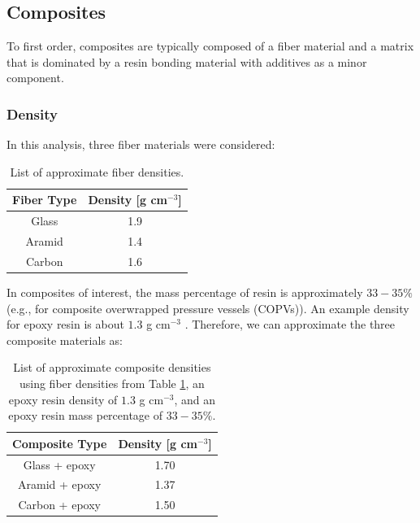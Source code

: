 \documentclass{hitec}
\begin{document}
\subsection{Composites}\label{ssec:composites}

To first order, composites are typically composed of a fiber material and a matrix that is dominated by a resin bonding material with additives as a minor component.

\subsubsection{Density}
In this analysis, three fiber materials were considered:


\begin{table}[h]\centering
	\caption{List of approximate fiber densities.}\label{tab:fiber_dens}
	\begin{tabular}{|c | c |}\hline
		Fiber Type & Density [g cm$^{-3}$] \\\hline
		Glass	& 1.9 \\\hline
		Aramid	& 1.4 \\\hline
		Carbon	& 1.6 \\\hline	
	\end{tabular}
\end{table}

In composites of interest, the mass percentage of resin is approximately $33-35\%$ (e.g., for composite overwrapped pressure vessels (COPVs)). An example density for epoxy resin is about $1.3$ g cm$^{-3}$ \citep{joven2013characterization}. Therefore, we can approximate the three composite materials as:

\begin{table}[h]\centering
	\caption{List of approximate composite densities using fiber densities from Table \ref{tab:fiber_dens}, an epoxy resin density of $1.3$ g cm$^{-3}$, and an epoxy resin mass percentage of $33-35\%$.}\label{tab:comp_dens}
	\begin{tabular}{|c | c |}\hline
		Composite Type & Density [g cm$^{-3}$] \\\hline
		Glass + epoxy	& 1.70 \\\hline
		Aramid + epoxy	& 1.37 \\\hline
		Carbon + epoxy	& 1.50 \\\hline	
	\end{tabular}
\end{table}
\end{document}
